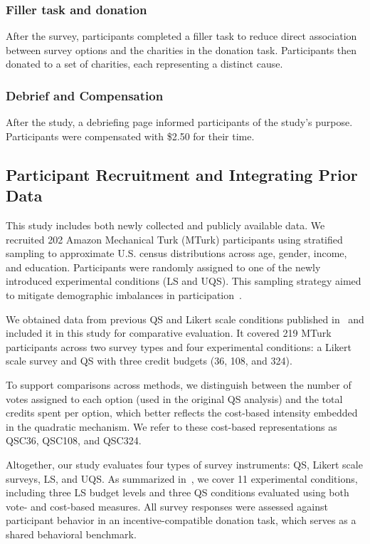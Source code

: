 \subsubsection{Filler task and donation}
After the survey, participants completed a filler task to reduce direct association between survey options and the charities in the donation task. Participants then donated to a set of charities, each representing a distinct cause.

\subsubsection{Debrief and Compensation}
After the study, a debriefing page informed participants of the study’s purpose. Participants were compensated with \$2.50 for their time.

\subsection{Participant Recruitment and Integrating Prior Data}
This study includes both newly collected and publicly available data. We recruited 202 Amazon Mechanical Turk (MTurk) participants using stratified sampling to approximate U.S. census distributions across age, gender, income, and education. Participants were randomly assigned to one of the newly introduced experimental conditions (LS and UQS). This sampling strategy aimed to mitigate demographic imbalances in participation~\cite{redmilesHowWellMy2019}.

We obtained data from previous QS and Likert scale conditions published in~\cite{chengCanShowWhat2021} and included it in this study for comparative evaluation. It covered 219 MTurk participants across two survey types and four experimental conditions: a Likert scale survey and QS with three credit budgets (36, 108, and 324).

To support comparisons across methods, we distinguish between the number of votes assigned to each option (used in the original QS analysis) and the total credits spent per option, which better reflects the cost-based intensity embedded in the quadratic mechanism. We refer to these cost-based representations as QSC36, QSC108, and QSC324.

Altogether, our study evaluates four types of survey instruments: QS, Likert scale surveys, LS, and UQS. As summarized in~, we cover 11 experimental conditions, including three LS budget levels and three QS conditions evaluated using both vote- and cost-based measures. All survey responses were assessed against participant behavior in an incentive-compatible donation task, which serves as a shared behavioral benchmark.

